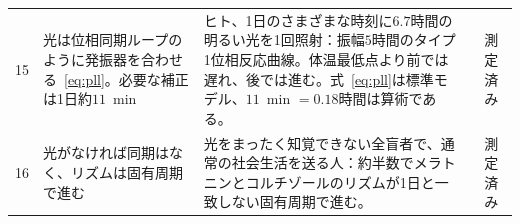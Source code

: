 {\begin{longtable}{>{\raggedright}p{0.5cm}>{\raggedright}p{4.0cm}>{\raggedright}p{5.6cm}>{\raggedright}p{2.3cm}>{\raggedright\arraybackslash}p{1.7cm}}
15 & 光は位相同期ループのように発振器を合わせる~\eqref{eq:pll}。必要な補正は1日約$11$~min & ヒト、1日のさまざまな時刻に$6.7$時間の明るい光を1回照射：振幅$5$時間のタイプ1位相反応曲線。体温最低点より前では遅れ、後では進む。式~\eqref{eq:pll}は標準モデル、$11$~min $=0.18$時間は算術である。 & \cite{Khalsa2003prc} & 測定済み \\
16 & 光がなければ同期はなく、リズムは固有周期で進む & 光をまったく知覚できない全盲者で、通常の社会生活を送る人：約半数でメラトニンとコルチゾールのリズムが1日と一致しない固有周期で進む。 & \cite{Sack1992blind} & 測定済み \\
\bottomrule
\end{longtable}}
